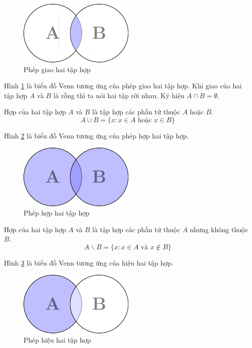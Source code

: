 \begin{figure}[ht]
    \centering
    \includegraphics{../pics/set/venn2.pdf}
    \caption{Phép giao hai tập hợp}
    \label{set1}
\end{figure}

Hình \ref{set1} là biểu đồ Venn tương ứng của phép giao hai tập hợp. Khi giao của hai 
tập hợp $A$ và $B$ là rỗng thì ta nói hai tập rời nhau. Ký hiệu $A \cap B = \emptyset$.

\begin{definition}
    Hợp của hai tập hợp $A$ và $B$ là tập hợp các phần tử thuộc $A$ hoặc $B$.
    \begin{equation}
        A \cup B = \{ x : x \in A \text{ hoặc } x \in B \}
    \end{equation}
\end{definition}

Hình \ref{set2} là biểu đồ Venn tương ứng của phép hợp hai tập hợp.

\begin{figure}[ht]
    \centering
    \includegraphics{../pics/set/venn3.pdf}
    \caption{Phép hợp hai tập hợp}
    \label{set2}
\end{figure}

\begin{definition}
    Hợp của hai tập hợp $A$ và $B$ là tập hợp các phần tử thuộc $A$ nhưng không thuộc $B$.
    \begin{equation}
        A \backslash B = \{ x : x \in A \text{ và } x \not\in B \}
    \end{equation}
\end{definition}

Hình \ref{set3} là biểu đồ Venn tương ứng của hiệu hai tập hợp.

\begin{figure}[ht]
    \centering
    \includegraphics{../pics/set/venn4.pdf}
    \caption{Phép hiệu hai tập hợp}
    \label{set3}
\end{figure}

